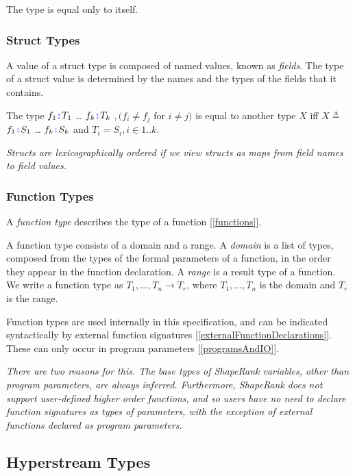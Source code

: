 \documentclass{article}
\begin{document}
The type \STRING{} is equal only to itself. 

\subsubsection{Struct Types}
\label{structTypes}

A value of a struct type is composed of named values, known as {\em fields}. The type of a struct value is determined by the names and the types of the fields that it contains.

\StructType{}

\PropertySig{}

The type \LCURLY{}$f_1 \texttt{\color{blue} :}{} T_1$\COMMA{} \ldots\COMMA{}  $f_k \texttt{\color{blue} :}{} T_k$\RCURLY{} $, (f_i \ne f_j$ for $i \ne j)$ is equal to another type $X$ iff  $X \triangleq $ \LCURLY{}$f_1 \texttt{\color{blue} :}{} S_1$\COMMA{} \ldots\COMMA{}  $f_k \texttt{\color{blue} :}{} S_k$\RCURLY{} and $T_i = S_i, i \in 1..k$.


{\em
Structs are lexicographically ordered if we view structs as maps from field names to field values. 
}

\subsubsection{Function Types}
\label{functionTypes}

A {\em function type} describes the type of a function [\ref{functions}].

A function type consists of a domain and a range. A {\em domain} is a list of types, composed from the types of the formal parameters of a function, in the order they appear in the function declaration. A {\em range} is a result type of a function. 
We write a  function type as $T_1, \ldots, T_n \to T_r$, where $T_1, \ldots, T_n$ is the domain and $T_r$ is the range.

Function types are used internally in this specification, and can be indicated syntactically by external function signatures [\ref{externalFunctionDeclarations}]. These can only occur in program parameters [\ref{programsAndIO}].

{\em 
There are two reasons for this.  The base types of ShapeRank variables, other than program parameters, are always inferred. Furthermore, ShapeRank does not support user-defined higher order functions, and so users have no need to declare function signatures as types of parameters,
with the exception of external functions declared as program parameters.
}


\subsection{Hyperstream Types}
\label{hyperstreamTypes} 
\end{document}
